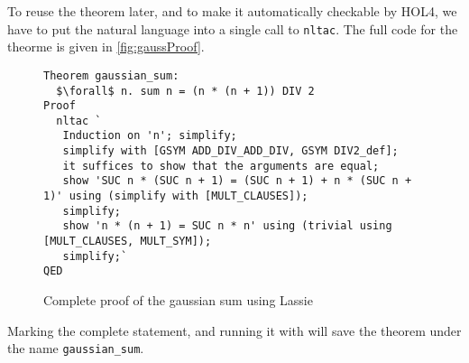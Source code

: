 To reuse the theorem later, and to make it automatically checkable by HOL4, we
have to put the natural language into a single call to \lstinline{nltac}.
The full code for the theorme is given in \autoref{fig:gaussProof}.
%
\begin{figure}[t]
\begin{lstlisting}[mathescape=true]
Theorem gaussian_sum:
  $\forall$ n. sum n = (n * (n + 1)) DIV 2
Proof
  nltac `
   Induction on 'n'; simplify;
   simplify with [GSYM ADD_DIV_ADD_DIV, GSYM DIV2_def];
   it suffices to show that the arguments are equal;
   show 'SUC n * (SUC n + 1) = (SUC n + 1) + n * (SUC n + 1)' using (simplify with [MULT_CLAUSES]);
   simplify;
   show 'n * (n + 1) = SUC n * n' using (trivial using [MULT_CLAUSES, MULT_SYM]);
   simplify;`
QED
\end{lstlisting}
\caption{Complete proof of the gaussian sum using Lassie}\label{fig:gaussProof}
\end{figure}

Marking the complete statement, and running it with  will save the
theorem under the name \lstinline{gaussian_sum}.